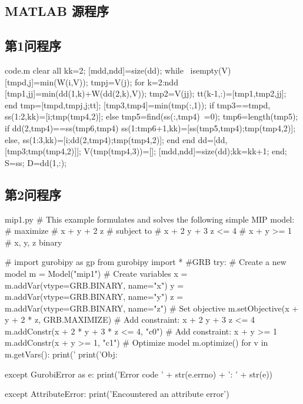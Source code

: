 \documentclass[bwprint]{gmcmthesis}
\numberwithin{equation}{section}
\numberwithin{figure}{section}
\numberwithin{table}{section}
\begin{document}
\clearpage





\clearpage
\begin{appendices}
\section{MATLAB 源程序}
\renewcommand{\thesubsection}{A.\arabic{subsection}}
\subsection{第1问程序}
\vspace{-2ex}

\begin{Matlab}{code.m}
clear all
kk=2;
[mdd,ndd]=size(dd);
while ~isempty(V)
    [tmpd,j]=min(W(i,V));
    tmpj=V(j);
    for k=2:ndd
        [tmp1,jj]=min(dd(1,k)+W(dd(2,k),V));
        tmp2=V(jj);
        tt(k-1,:)=[tmp1,tmp2,jj];
    end
    tmp=[tmpd,tmpj,j;tt];
    [tmp3,tmp4]=min(tmp(:,1));
    if tmp3==tmpd,
        ss(1:2,kk)=[i;tmp(tmp4,2)];
    else
        tmp5=find(ss(:,tmp4)~=0);
        tmp6=length(tmp5);
        if dd(2,tmp4)==ss(tmp6,tmp4)
            ss(1:tmp6+1,kk)=[ss(tmp5,tmp4);tmp(tmp4,2)];
        else, ss(1:3,kk)=[i;dd(2,tmp4);tmp(tmp4,2)];
        end
    end
    dd=[dd,[tmp3;tmp(tmp4,2)]];
    V(tmp(tmp4,3))=[];
    [mdd,ndd]=size(dd);kk=kk+1;
end;
S=ss; D=dd(1,:);
\end{Matlab}
\vspace{2ex}

\subsection{第2问程序}
\vspace{-2ex}
\begin{Python}{mip1.py}
# This example formulates and solves the following simple MIP model:
#  maximize
#        x +   y + 2 z
#  subject to
#        x + 2 y + 3 z <= 4
#        x +   y       >= 1
#        x, y, z binary

# import gurobipy as gp
from gurobipy import * #GRB
try:
    # Create a new model
    m = Model("mip1")
    # Create variables
    x = m.addVar(vtype=GRB.BINARY, name="x")
    y = m.addVar(vtype=GRB.BINARY, name="y")
    z = m.addVar(vtype=GRB.BINARY, name="z")
    # Set objective
    m.setObjective(x + y + 2 * z, GRB.MAXIMIZE)
    # Add constraint: x + 2 y + 3 z <= 4
    m.addConstr(x + 2 * y + 3 * z <= 4, "c0")
    # Add constraint: x + y >= 1
    m.addConstr(x + y >= 1, "c1")
    # Optimize model
    m.optimize()
    for v in m.getVars():
        print('%
    print('Obj: %

except GurobiError as e:
    print('Error code ' + str(e.errno) + ': ' + str(e))

except AttributeError:
    print('Encountered an attribute error')
\end{Python}

\end{appendices}
\end{document}
